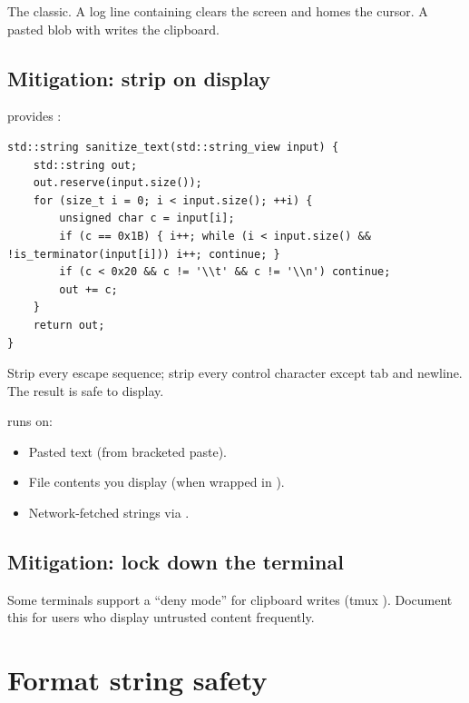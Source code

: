 The classic. A log line containing
\code{\\e[2J\\e[H} clears the screen and homes the cursor.
A pasted blob with \code{\\e]52;c;<base64>\\e\\textbackslash}
writes the clipboard.

\subsection*{Mitigation: strip on display}

\maya{} provides :

\begin{lstlisting}
std::string sanitize_text(std::string_view input) {
    std::string out;
    out.reserve(input.size());
    for (size_t i = 0; i < input.size(); ++i) {
        unsigned char c = input[i];
        if (c == 0x1B) { i++; while (i < input.size() && !is_terminator(input[i])) i++; continue; }
        if (c < 0x20 && c != '\\t' && c != '\\n') continue;
        out += c;
    }
    return out;
}
\end{lstlisting}

Strip every escape sequence; strip every control character
except tab and newline. The result is safe to display.

\maya{} runs  on:

\begin{itemize}[leftmargin=*]
  \item Pasted text (from bracketed paste).
  \item File contents you display (when wrapped in
    ).
  \item Network-fetched strings via .
\end{itemize}

\subsection*{Mitigation: lock down the terminal}

Some terminals support a ``deny mode'' for clipboard writes
(tmux ). Document this for users who
display untrusted content frequently.

\section{Format string safety}


